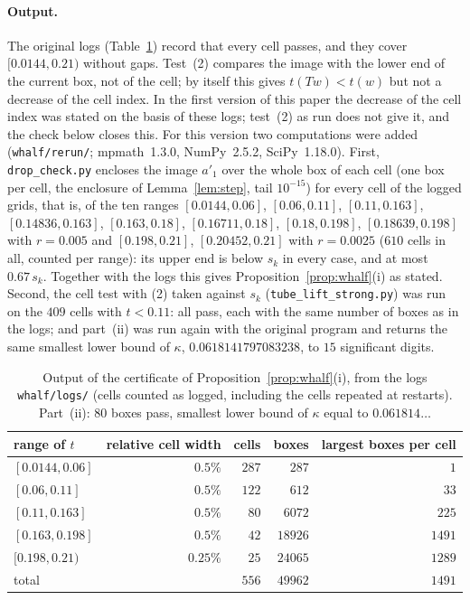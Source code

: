\documentclass[11pt,a4paper]{article}
\theoremstyle{definition}
\theoremstyle{remark}
\newcommand{\code}[1]{\texttt{#1}}
\begin{document}
\paragraph{Output.}
{\sloppy The original logs (Table~\ref{tab:whalf}) record that every cell passes, and they cover $[0.0144,0.21)$ without gaps.
Test~(2) compares the image with the lower end of the current box, not of the cell; by itself this gives $t(Tw)<t(w)$ but not a decrease of the cell index. In the first version of this paper the decrease of the cell index was stated on the basis of these logs; test~(2) as run does not give it, and the check below closes this.
For this version two computations were added (\code{whalf/rerun/}; mpmath~1.3.0, NumPy~2.5.2, SciPy~1.18.0).
First, \code{drop\_check.py} encloses the image $a'_1$ over the whole box of each cell (one box per cell, the enclosure of Lemma~\ref{lem:step}, tail $10^{-15}$) for every cell of the logged grids, that is, of the ten ranges $[0.0144,0.06]$, $[0.06,0.11]$, $[0.11,0.163]$, $[0.14836,0.163]$, $[0.163,0.18]$, $[0.16711,0.18]$, $[0.18,0.198]$, $[0.18639,0.198]$ with $r=0.005$ and $[0.198,0.21]$, $[0.20452,0.21]$ with $r=0.0025$ ($610$ cells in all, counted per range): its upper end is below $s_k$ in every case, and at most $0.67\,s_k$.
Together with the logs this gives Proposition~\ref{prop:whalf}(i) as stated.
Second, the cell test with (2) taken against $s_k$ (\code{tube\_lift\_strong.py}) was run on the $409$ cells with $t<0.11$: all pass, each with the same number of boxes as in the logs; and part~(ii) was run again with the original program and returns the same smallest lower bound of $\kappa$, $0.0618141797083238$, to $15$ significant digits.\par}

\begin{table}[ht]\centering\small
\begin{tabular}{lrrrr}
\toprule
range of $t$ & relative cell width & cells & boxes & largest boxes per cell \\
\midrule
$[0.0144,0.06]$ & $0.5\%$ & $287$ & $287$ & $1$ \\
$[0.06,0.11]$ & $0.5\%$ & $122$ & $612$ & $33$ \\
$[0.11,0.163]$ & $0.5\%$ & $80$ & $6072$ & $225$ \\
$[0.163,0.198]$ & $0.5\%$ & $42$ & $18926$ & $1491$ \\
$[0.198,0.21)$ & $0.25\%$ & $25$ & $24065$ & $1289$ \\
\midrule
total & & $556$ & $49962$ & $1491$ \\
\bottomrule
\end{tabular}
\caption{Output of the certificate of Proposition~\ref{prop:whalf}(i), from the logs \code{whalf/logs/} (cells counted as logged, including the cells repeated at restarts). Part~(ii): $80$ boxes pass, smallest lower bound of $\kappa$ equal to $0.061814\ldots$}\label{tab:whalf}
\end{table}
\end{document}
